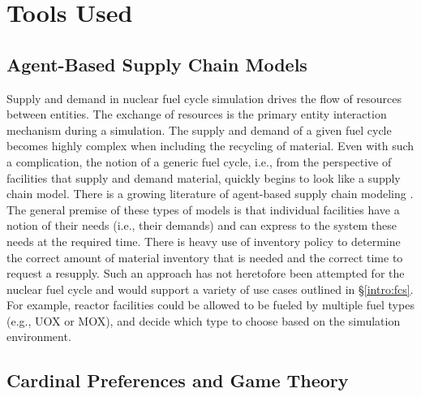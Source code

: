 
\section{Tools Used}

\subsection{Agent-Based Supply Chain Models}\label{intro:sim}

Supply and demand in nuclear fuel cycle simulation drives the flow of resources
between entities. The exchange of resources is the primary entity interaction
mechanism during a simulation. The supply and demand of a given fuel cycle
becomes highly complex when including the recycling of material. Even with such
a complication, the notion of a generic fuel cycle, i.e., from the perspective
of facilities that supply and demand material, quickly begins to look like a
supply chain model. There is a growing literature of agent-based supply chain
modeling
\cite{swaminathan_modeling_1998,julka_agent-based_2002,van_der_zee_modeling_2005,chatfield_multi-formalism_2007,holmgren_agent_2007}.
The general premise of these types of models is that individual facilities have
a notion of their needs (i.e., their demands) and can express to the system
these needs at the required time. There is heavy use of inventory policy to
determine the correct amount of material inventory that is needed and the
correct time to request a resupply. Such an approach has not heretofore been
attempted for the nuclear fuel cycle and would support a variety of use cases
outlined in \S \ref{intro:fcs}. For example, reactor facilities could be allowed
to be fueled by multiple fuel types (e.g., UOX or MOX), and decide which type to
choose based on the simulation environment.

\subsection{Cardinal Preferences and Game Theory}\label{intro:prefs}

